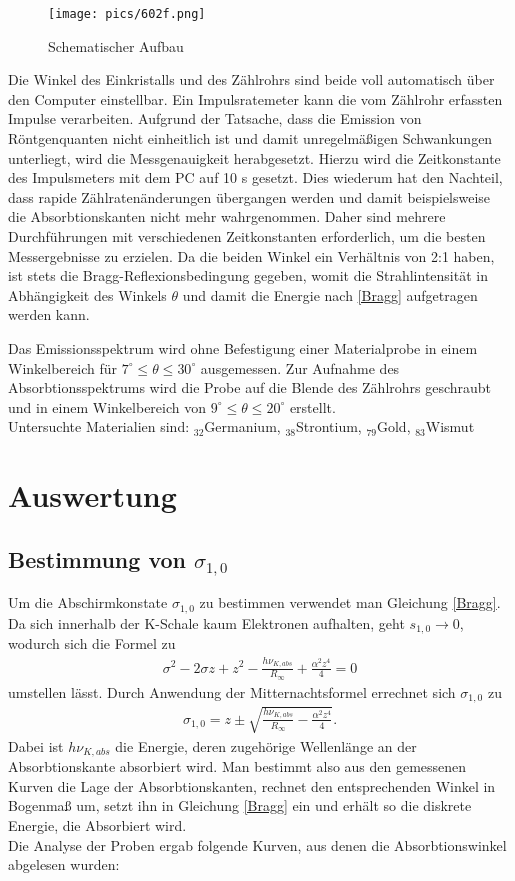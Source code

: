 \begin{figure}[H]
\texttt{[image: pics/602f.png]}
\centering
\caption{Schematischer Aufbau}
\label{Aufbau}
\end{figure}


Die Winkel des Einkristalls und des Zählrohrs sind beide voll automatisch über den Computer einstellbar. Ein Impulsratemeter
kann die vom Zählrohr erfassten Impulse verarbeiten. Aufgrund der Tatsache, dass die Emission von Röntgenquanten nicht
einheitlich ist und damit unregelmäßigen Schwankungen unterliegt, wird die Messgenauigkeit herabgesetzt. Hierzu wird die
Zeitkonstante des Impulsmeters mit dem PC auf 10 s gesetzt. Dies wiederum hat den Nachteil, dass rapide Zählratenänderungen
übergangen werden und damit beispielsweise die Absorbtionskanten nicht mehr wahrgenommen. Daher sind mehrere Durchführungen
mit verschiedenen Zeitkonstanten erforderlich, um die besten Messergebnisse zu erzielen. Da die beiden Winkel ein Verhältnis
von 2:1 haben, ist stets die Bragg-Reflexionsbedingung gegeben, womit die Strahlintensität in Abhängigkeit des Winkels
$\theta$ und damit die Energie nach \eqref{Bragg} aufgetragen werden kann.

Das Emissionsspektrum wird ohne Befestigung einer Materialprobe in einem Winkelbereich für $7^\circ \le \theta \le 30^\circ$ ausgemessen.
Zur Aufnahme des Absorbtionsspektrums wird die Probe auf die Blende des Zählrohrs geschraubt und in einem Winkelbereich von
$9^\circ \le \theta \le 20^\circ$ erstellt.\\
Untersuchte Materialien sind: $_{32}$Germanium, $_{38}$Strontium, $_{79}$Gold, $_{83}$Wismut

 
\section{Auswertung}
\subsection{Bestimmung von $\sigma_{1,0}$}
Um die Abschirmkonstate $\sigma_{1,0}$ zu bestimmen verwendet man Gleichung \ref{Bragg}.
Da sich innerhalb der K-Schale kaum Elektronen aufhalten, geht $s_{1,0}\rightarrow 0$, wodurch sich die Formel zu
\begin{align}
\sigma^2-2\sigma z+z^2-\frac{h\nu_{K,abs}}{R_\infty}+\frac{\alpha^2z^4}{4} =0
\end{align}
umstellen lässt.
Durch Anwendung der Mitternachtsformel errechnet sich $\sigma_{1,0}$ zu
\begin{align}
	\sigma_{1,0}=z\pm\sqrt{\frac{h\nu_{K,abs}}{R_\infty}-\frac{\alpha^2z^4}{4}}.
	\label{sigma10}
\end{align}
Dabei ist $h \nu_{K,abs}$ die Energie, deren zugehörige Wellenlänge an der Absorbtionskante absorbiert wird. Man bestimmt also aus den gemessenen Kurven die Lage der Absorbtionskanten, rechnet den entsprechenden Winkel in Bogenmaß um, setzt ihn in Gleichung \eqref{Bragg} ein und erhält so die diskrete Energie, die Absorbiert wird.\\
Die Analyse der Proben ergab folgende Kurven, aus denen die Absorbtionswinkel abgelesen wurden:

